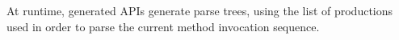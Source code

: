 At runtime, \Self generated APIs generate parse trees, using the list
  of productions used in order to parse the current method invocation sequence.

